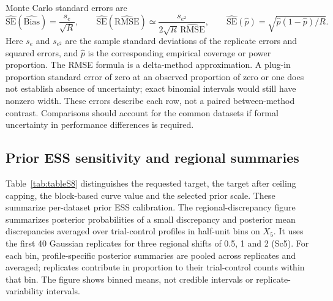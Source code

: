 Monte Carlo standard errors are
\begin{equation}
\widehat{\mathrm{SE}}(\widehat{\mathrm{Bias}})=\frac{s_e}{\sqrt R},\qquad
\widehat{\mathrm{SE}}(\widehat{\mathrm{RMSE}})\simeq
\frac{s_{e^2}}{2\sqrt R\,\widehat{\mathrm{RMSE}}},\qquad
\widehat{\mathrm{SE}}(\widehat p)=\sqrt{\widehat p(1-\widehat p)/R}.
\end{equation}
Here $s_e$ and $s_{e^2}$ are the sample standard deviations of the replicate errors and squared errors, and $\widehat p$ is the corresponding empirical coverage or power proportion. The RMSE formula is a delta-method approximation. A plug-in proportion standard error of zero at an observed proportion of zero or one does not establish absence of uncertainty; exact binomial intervals would still have nonzero width. These errors describe each row, not a paired between-method contrast. Comparisons should account for the common datasets if formal uncertainty in performance differences is required.


\clearpage

\clearpage

\clearpage

\clearpage
\subsection{Prior ESS sensitivity and regional summaries}\label{sec:E.6}
Table~\ref{tab:tableS8} distinguishes the requested target, the target after ceiling capping, the block-based curve value and the selected prior scale. These summarize per-dataset prior ESS calibration. The regional-discrepancy figure summarizes posterior probabilities of a small discrepancy and posterior mean discrepancies averaged over trial-control profiles in half-unit bins on $X_5$. It uses the first 40 Gaussian replicates for three regional shifts of 0.5, 1 and 2 (Sc5). For each bin, profile-specific posterior summaries are pooled across replicates and averaged; replicates contribute in proportion to their trial-control counts within that bin. The figure shows binned means, not credible intervals or replicate-variability intervals.

\clearpage
